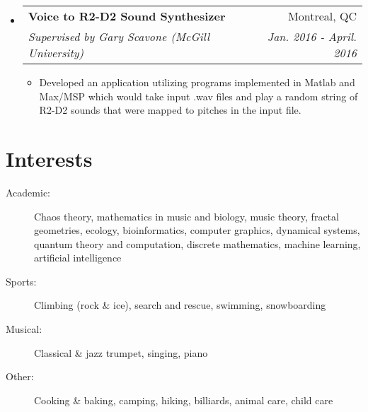 \documentclass[letterpaper,11pt]{article}
\makeatletter
\newcommand{\resitem}[1]{\item #1 \vspace{-2pt}}
\newcommand{\ressubheading}[4]{
\begin{tabular*}{6.1in}{l@{\extracolsep{\fill}}r}
		\textbf{#1} & #2 \\
		\textit{#3} & \textit{#4} \\
\end{tabular*}\vspace{-1pt}}
\makeatother
\begin{document}
\begin{itemize}
\item
	\ressubheading{Voice to R2-D2 Sound Synthesizer}{Montreal, QC}{Supervised by Gary Scavone (McGill University)}{Jan. 2016 - April. 2016}
	\begin{itemize}
		\resitem{Developed an application utilizing programs implemented in Matlab and Max/MSP which would take input .wav files and play a random string of R2-D2 sounds that were mapped to pitches in the input file.}
	\end{itemize}

\end{itemize}

\section*{Interests}

\begin{description}
\item[Academic:] Chaos theory, mathematics in music and biology, music theory, fractal geometries, ecology, bioinformatics, computer graphics, dynamical systems, quantum theory and computation, discrete mathematics, machine learning, artificial intelligence

\item[Sports:] Climbing (rock \& ice), search and rescue, swimming, snowboarding

\item[Musical:] Classical \& jazz trumpet, singing, piano 

\item[Other:] Cooking \& baking, camping, hiking, billiards, animal care, child care
\end{description}
\end{document}
